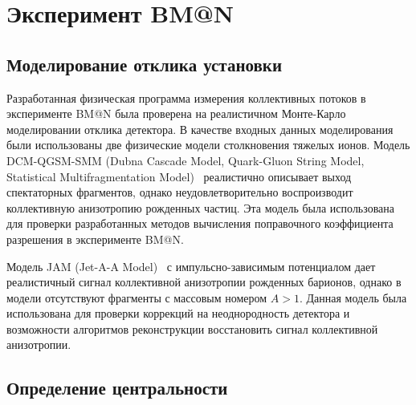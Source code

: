 \section{Эксперимент BM@N}

\subsection{Моделирование отклика установки}

Разработанная физическая программа измерения коллективных потоков в эксперименте BM@N была проверена на реалистичном Монте-Карло моделировании отклика детектора. 
В качестве входных данных моделирования были использованы две физические модели столкновения тяжелых ионов.
Модель DCM-QGSM-SMM (Dubna Cascade Model, Quark-Gluon String Model, Statistical Multifragmentation Model)~\cite{Botvina:1994vj,Baznat:2019iom} реалистично описывает выход спектаторных фрагментов, однако неудовлетворительно воспроизводит коллективную анизотропию рожденных частиц.
Эта модель была использована для проверки разработанных методов вычисления поправочного коэффициента разрешения в эксперименте BM@N.

Модель JAM (Jet-A-A Model)~\cite{Nara:2016hbg,Nara:2019qfd,Nara:2020ztb} с импульсно-зависимым потенциалом дает реалистичный сигнал коллективной анизотропии рожденных барионов, однако в модели отсутствуют фрагменты с массовым номером $A>1$.
Данная модель была использована для проверки коррекций на неоднородность детектора и возможности алгоритмов реконструкции восстановить сигнал коллективной анизотропии.

\subsection{Определение центральности}

